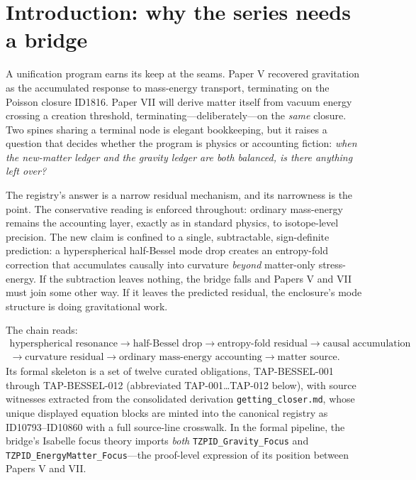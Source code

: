 \documentclass[11pt]{article}
\theoremstyle{remark}
\begin{document}
\section{Introduction: why the series needs a bridge}
\label{sec:intro}

A unification program earns its keep at the seams. Paper V recovered gravitation as the accumulated response to mass-energy transport, terminating on the Poisson closure ID1816. Paper VII will derive matter itself from vacuum energy crossing a creation threshold, terminating---deliberately---on the \emph{same} closure. Two spines sharing a terminal node is elegant bookkeeping, but it raises a question that decides whether the program is physics or accounting fiction: \emph{when the new-matter ledger and the gravity ledger are both balanced, is there anything left over?}

The registry's answer is a narrow residual mechanism, and its narrowness is the point. The conservative reading is enforced throughout: ordinary mass-energy remains the accounting layer, exactly as in standard physics, to isotope-level precision. The new claim is confined to a single, subtractable, sign-definite prediction: a hyperspherical half-Bessel mode drop creates an entropy-fold correction that accumulates causally into curvature \emph{beyond} matter-only stress-energy. If the subtraction leaves nothing, the bridge falls and Papers V and VII must join some other way. If it leaves the predicted residual, the enclosure's mode structure is doing gravitational work.

The chain reads:
\begin{equation*}
\begin{gathered}
\text{hyperspherical resonance} \to \text{half-Bessel drop} \to \text{entropy-fold residual} \to \text{causal accumulation} \\
\to \text{curvature residual} \to \text{ordinary mass-energy accounting} \to \text{matter source}.
\end{gathered}
\end{equation*}
Its formal skeleton is a set of twelve curated obligations, TAP-BESSEL-001 through TAP-BESSEL-012 (abbreviated TAP-001\ldots TAP-012 below), with source witnesses extracted from the consolidated derivation \texttt{getting\_closer.md}, whose unique displayed equation blocks are minted into the canonical registry as ID10793--ID10860 with a full source-line crosswalk. In the formal pipeline, the bridge's Isabelle focus theory imports \emph{both} \texttt{TZPID\_Gravity\_Focus} and \texttt{TZPID\_EnergyMatter\_Focus}---the proof-level expression of its position between Papers V and VII.
\end{document}
